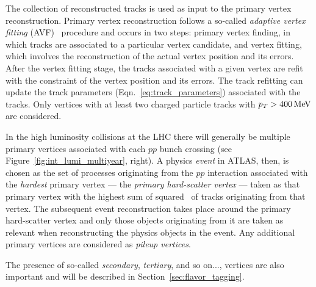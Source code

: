 The collection of reconstructed tracks is used as input to the primary vertex reconstruction.
Primary vertex reconstruction follows a so-called \textit{adaptive vertex fitting} (AVF)~\cite{Aaboud:2016rmg,Piacquadio_2008}
procedure and occurs in two steps: primary vertex finding,
in which tracks are associated to a particular vertex candidate, and vertex fitting,
which involves the reconstruction of the actual vertex position and its errors.
After the vertex fitting stage, the tracks associated with a given vertex are refit
with the constraint of the vertex position and its errors. The track refitting can update
the track parameters (Eqn.~\ref{eq:track_parameters}) associated with the tracks.
Only vertices with at least two charged particle tracks with $p_{T} > 400\,\text{Me\kern -0.1em V}$ are
considered.

In the high luminosity collisions at the LHC there will generally be multiple primary vertices
associated with each $pp$ bunch crossing (see Figure~\ref{fig:int_lumi_multiyear}, right).
A physics \textit{event} in ATLAS, then, is chosen as the set of processes originating from the $pp$ interaction
associated with the \textit{hardest} primary vertex --- the \textit{primary hard-scatter vertex} --- taken as that primary vertex with the
highest sum of squared \pT~of tracks originating from that vertex.
The subsequent event reconstruction takes place around the primary hard-scatter vertex and only
those objects originating from it are taken as relevant when reconstructing the physics objects in the event.
Any additional primary vertices are considered as \textit{pileup vertices}.

The presence of so-called \textit{secondary}, \textit{tertiary}, and so on..., vertices are also
important and will be described in Section~\ref{sec:flavor_tagging}.

